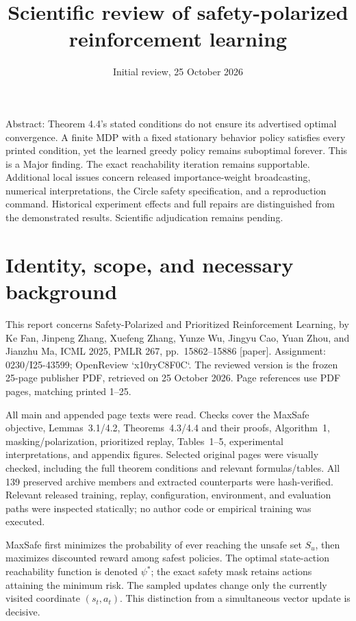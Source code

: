 \documentclass[10pt]{article}
\title{Scientific review of safety-polarized reinforcement learning}
\author{}
\date{Initial review, 25 October 2026}
\begin{document}
\maketitle
Abstract: Theorem 4.4’s stated conditions do not ensure its advertised optimal convergence. A finite MDP with a fixed stationary behavior policy satisfies every printed condition, yet the learned greedy policy remains suboptimal forever. This is a Major finding. The exact reachability iteration remains supportable. Additional local issues concern released importance-weight broadcasting, numerical interpretations, the Circle safety specification, and a reproduction command. Historical experiment effects and full repairs are distinguished from the demonstrated results. Scientific adjudication remains pending.\par
\section*{Identity, scope, and necessary background}
This report concerns Safety-Polarized and Prioritized Reinforcement Learning, by Ke Fan, Jinpeng Zhang, Xuefeng Zhang, Yunze Wu, Jingyu Cao, Yuan Zhou, and Jianzhu Ma, ICML 2025, PMLR 267, pp. 15862–15886 [paper]. Assignment: 0230/I25-43599; OpenReview `x10ryC8F0C`. The reviewed version is the frozen 25-page publisher PDF, retrieved on 25 October 2026. Page references use PDF pages, matching printed 1–25.\par
All main and appended page texts were read. Checks cover the MaxSafe objective, Lemmas 3.1/4.2, Theorems 4.3/4.4 and their proofs, Algorithm 1, masking/polarization, prioritized replay, Tables 1–5, experimental interpretations, and appendix figures. Selected original pages were visually checked, including the full theorem conditions and relevant formulas/tables. All 139 preserved archive members and extracted counterparts were hash-verified. Relevant released training, replay, configuration, environment, and evaluation paths were inspected statically; no author code or empirical training was executed.\par
MaxSafe first minimizes the probability of ever reaching the unsafe set \(S_u\), then maximizes discounted reward among safest policies. The optimal state-action reachability function is denoted \(\psi^*\); the exact safety mask retains actions attaining the minimum risk. The sampled updates change only the currently visited coordinate \((s_t,a_t)\). This distinction from a simultaneous vector update is decisive.\par
\end{document}

